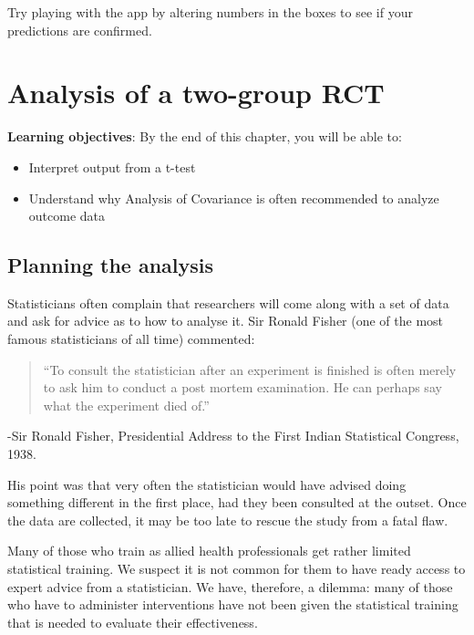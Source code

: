 \documentclass{krantz}
\providecommand{\tightlist}{%
\setlength{\itemsep}{0pt}\setlength{\parskip}{0pt}}
\begin{document}
Try playing with the app by altering numbers in the boxes to see if your predictions are confirmed.

\hypertarget{analysis}{%
\chapter{Analysis of a two-group RCT}\label{analysis}}

\textbf{Learning objectives}: By the end of this chapter, you will be able to:

\begin{itemize}
\tightlist
\item
  Interpret output from a t-test
\item
  Understand why Analysis of Covariance is often recommended to analyze outcome data
\end{itemize}

\hypertarget{planning-the-analysis}{%
\section{Planning the analysis}\label{planning-the-analysis}}

Statisticians often complain that researchers will come along with a set of data and ask for advice as to how to analyse it. Sir Ronald Fisher (one of the most famous statisticians of all time) commented:

\begin{quote}
``To consult the statistician after an experiment is finished is often merely to ask him to conduct a post mortem examination. He can perhaps say what the experiment died of.''
\end{quote}

-Sir Ronald Fisher, Presidential Address to the First Indian Statistical Congress, 1938.

His point was that very often the statistician would have advised doing something different in the first place, had they been consulted at the outset. Once the data are collected, it may be too late to rescue the study from a fatal flaw.

Many of those who train as allied health professionals get rather limited statistical training. We suspect it is not common for them to have ready access to expert advice from a statistician. We have, therefore, a dilemma: many of those who have to administer interventions have not been given the statistical training that is needed to evaluate their effectiveness.
\end{document}
